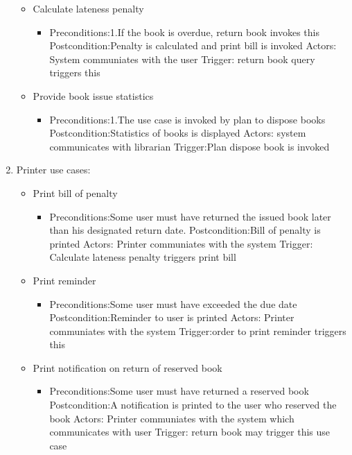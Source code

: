 \documentclass{article}
\begin{document}
\begin{enumerate}
\begin{itemize}
\item Calculate lateness penalty
	\begin{itemize}
	\item  Preconditions:1.If the book is overdue, return book invokes this
 Postcondition:Penalty is calculated and print bill is invoked
 Actors: System communiates with the user
 Trigger: return book query triggers this
	\end{itemize}
 
 \item Provide book issue statistics
	\begin{itemize}
	\item  Preconditions:1.The use case is invoked by plan to dispose books
 Postcondition:Statistics of books is displayed
 Actors: system communicates with librarian
 Trigger:Plan dispose book is invoked
	\end{itemize}

 \end{itemize}
\item Printer use cases:
\begin{itemize}
\item Print bill of penalty
\begin{itemize}
\item Preconditions:Some user must have returned the issued book later than his designated return date.
 Postcondition:Bill of penalty is printed
 Actors: Printer communiates with the system
 Trigger: Calculate lateness penalty triggers print bill
\end{itemize}

\item Print reminder
\begin{itemize}
\item  Preconditions:Some user must have exceeded the due date
 Postcondition:Reminder to user is printed
 Actors: Printer communiates with the system
 Trigger:order to print reminder triggers this
\end{itemize}

\item Print notification on return of reserved book
\begin{itemize}
\item Preconditions:Some user must have returned a reserved book 
 Postcondition:A notification is printed to the user who reserved the book
 Actors: Printer communiates with the system which communicates with user
 Trigger: return book may trigger this use case
\end{itemize}

\end{itemize}
\end{enumerate}
\end{document}
